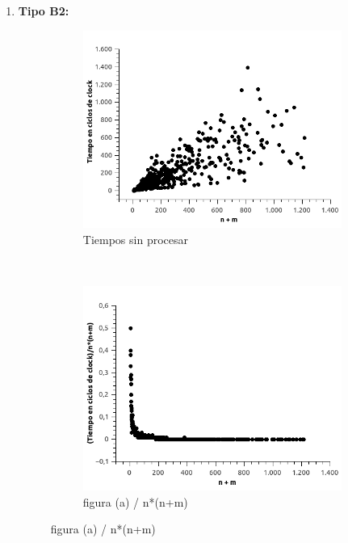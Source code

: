 \begin{enumerate}
\begin{figure}[H]
\end{figure}


\item \textbf{Tipo B2:}

\begin{figure}[H]
        \centering
        \begin{subfigure}[b]{0.5\textwidth}
                \includegraphics[width=\textwidth]{imagenes/ejer4-grafB2-1.jpg}
                \caption{Tiempos sin procesar}
        \end{subfigure}%
        ~ %
        \begin{subfigure}[b]{0.5\textwidth}
                \includegraphics[width=\textwidth]{imagenes/ejer4-grafB2-2.jpg}
                \caption{figura (a) / n*(n+m)}
        \end{subfigure}
        

\end{figure}
\end{enumerate}

